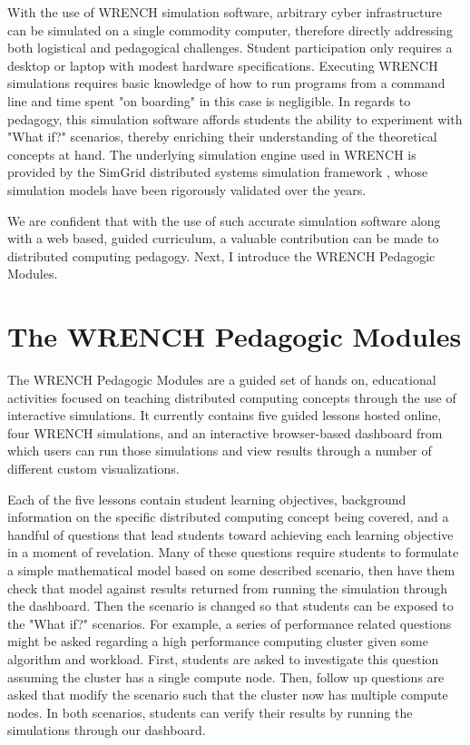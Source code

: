 \documentclass{article}
\begin{document}
With the use of WRENCH simulation software, arbitrary cyber infrastructure can be simulated
on a single commodity computer, therefore directly addressing both logistical and 
pedagogical challenges. Student participation only requires a desktop or laptop with modest
hardware specifications. Executing WRENCH simulations requires basic knowledge of how to
run programs from a command line and time spent "on boarding" in this case is
negligible. In regards to pedagogy, this simulation software affords students the ability
to experiment with "What if?" scenarios, thereby enriching their understanding of the
theoretical concepts at hand. The underlying simulation engine used in WRENCH is provided
by the SimGrid distributed systems simulation framework \cite{simgrid}, whose simulation models have been 
rigorously validated over the years. 

We are confident that with the use of such accurate simulation
software along with a web based, guided curriculum, a valuable contribution can be made to
distributed computing pedagogy. Next, I introduce the WRENCH Pedagogic Modules.


\section{The WRENCH Pedagogic Modules}
The WRENCH Pedagogic Modules are a guided set of hands on, educational activities focused
on teaching distributed computing concepts through the use of interactive simulations. It currently 
contains five guided lessons hosted online, four WRENCH simulations, and an interactive
browser-based dashboard from which users can run those simulations and view results through
a number of different custom visualizations. 

Each of the five lessons contain student learning objectives, background information on the specific
distributed computing concept being covered, and a handful of questions that lead students toward
achieving each learning objective in a moment of revelation. Many of these questions require students
to formulate a simple mathematical model based on some described scenario, then have them check that
model against results returned from running the simulation through the dashboard. Then the scenario
is changed so that students can be exposed to the "What if?" scenarios. For example, 
a series of performance related questions might be asked regarding a high performance computing
cluster given some algorithm and workload. First, students are asked to investigate this question
assuming the cluster has a single compute node. Then, follow up questions are asked that modify
the scenario such that the cluster now has multiple compute nodes. In both scenarios, students can
verify their results by running the simulations through our dashboard. 
\end{document}
